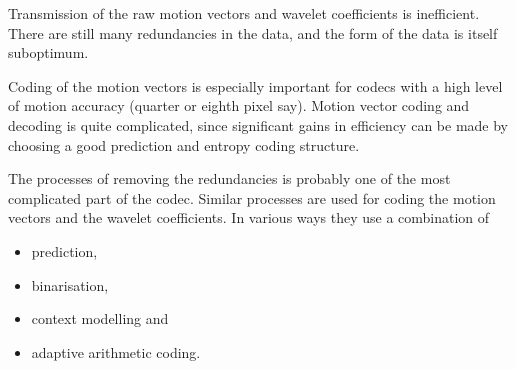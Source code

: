 Transmission of the raw motion vectors and wavelet coefficients is
inefficient. There are still many redundancies in the data, and the form
of the data is itself suboptimum.

Coding of the motion vectors is especially important for codecs with a
high level of motion accuracy (quarter or eighth pixel say). Motion
vector coding and decoding is quite complicated, since significant gains
in efficiency can be made by choosing a good prediction and entropy
coding structure.

The processes of removing the redundancies is probably one of the most
complicated part of the codec. Similar processes are used for coding the
motion vectors and the wavelet coefficients. In various ways they use a
combination of

\begin{itemize}
	\item prediction,
	\item binarisation,
	\item context modelling and
	\item adaptive arithmetic coding.
\end{itemize}
